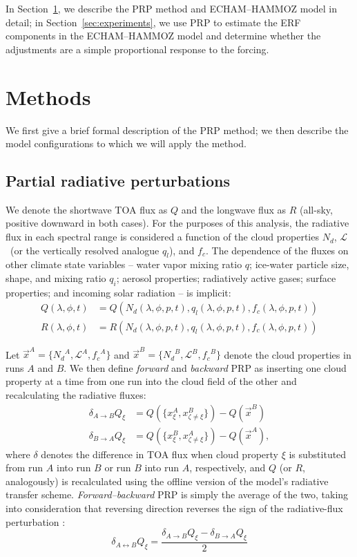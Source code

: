 \documentclass[acp, manuscript]{copernicus}\usepackage[]{graphicx}\usepackage[]{color}
\newcommand\nd{\ensuremath{N_d}}
\newcommand\lwp{\ensuremath{\mathcal L}}
\newcommand\fc{\ensuremath{f_c}}
\newcommand\cf{\fc}
\newcommand\ql{\ensuremath{q_l}}
\newcommand\qi{\ensuremath{q_i}}
\newcommand\lon{\ensuremath{\lambda}}
\newcommand\lat{\ensuremath{\phi}}
\begin{document}
In Section~\ref{sec:method}, we describe the PRP method and
ECHAM--HAMMOZ model in detail; in
Section~\ref{sec:experiments}, we use PRP to estimate the ERF components in the
ECHAM--HAMMOZ model and determine whether the adjustments are a simple proportional
response to the forcing.  

\section{Methods}
\label{sec:method}

We first give a brief formal description of the PRP method; we then describe the
model configurations to which we will apply the method.

\subsection{Partial radiative perturbations}

We denote the shortwave TOA flux as $Q$ and the longwave flux as $R$ (all-sky,
positive downward in both cases).  For the purposes of this analysis, the radiative flux in
each spectral range is considered a function of the cloud properties \nd, \lwp\
(or the vertically resolved analogue \ql),
and \cf.  The dependence of the fluxes on other climate state variables -- water
vapor mixing ratio $q$; ice-water particle size, shape, and mixing ratio \qi;
aerosol properties; radiatively active gases; surface properties; and incoming
solar radiation -- is implicit:
\begin{align}
  \label{eq:fluxes}
  Q(\lon,\lat,t) &= Q(\nd(\lon,\lat, p,t), \ql(\lon,\lat,p,t), \cf(\lon,\lat,p,t)) \\
  R(\lon,\lat,t) &= R(\nd(\lon,\lat, p,t), \ql(\lon,\lat,p,t), \cf(\lon,\lat,p,t)) 
\end{align}

Let $\vec{x}^A = \{\nd^A, \lwp^A, \cf^A\}$ and
$\vec{x}^B = \{\nd^B, \lwp^B, \cf^B\}$ denote the cloud properties in runs $A$ and
$B$.  We then define \textit{forward} and \textit{backward} PRP as inserting one
cloud property at a time from one run into the cloud field of the other and
recalculating the radiative fluxes:
\begin{align}
  \label{eq:prp-fw-bk}
  \delta_{A\rightarrow B} Q_\xi & = Q(\{x_\xi^A, x_{\zeta{}\neq \xi}^B\}) - Q(\vec{x}^B) \\
  \delta_{B\rightarrow A} Q_\xi & = Q(\{x_\xi^B, x_{\zeta{}\neq \xi}^A\}) - Q(\vec{x}^A),
\end{align}
where $\delta$ denotes the difference in TOA flux when cloud
property $\xi$ is substituted from run $A$ into run $B$ or run $B$ into run 
$A$, respectively, and $Q$ (or $R$, analogously) is recalculated using the offline
version of the model's radiative transfer scheme.  \textit{Forward--backward} PRP is
simply the average of the two, taking into consideration that reversing
direction reverses the sign of the radiative-flux perturbation \citep[e.g.,][]{Klocke2013}:
\begin{equation}
  \label{eq:prp}
  \delta_{A\leftrightarrow B} Q_\xi = \frac{\delta_{A\rightarrow B} Q_\xi - \delta_{B\rightarrow A} Q_\xi} 2
\end{equation}
\end{document}
